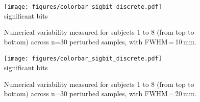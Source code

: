 \documentclass[lettersize,journal]{IEEEtran}
\begin{document}
\begin{figure}
  \vspace*{-2cm}
  \centering
  \vspace*{-20pt}\hspace{15pt}
  \texttt{[image: figures/colorbar\_sigbit\_discrete.pdf]} \\
  \vspace*{-5pt}
  significant bits
  \caption{Numerical variability measured for subjects 1 to 8 (from top to bottom) across n=30 perturbed samples, with FWHM\,=\,10\,mm. }
  \label{fig:uncertainty-maps-10mm-disc}
\end{figure}

\begin{figure}
  \vspace*{-2cm}
  \centering
  \vspace*{-20pt}\hspace{15pt}
  \texttt{[image: figures/colorbar\_sigbit\_discrete.pdf]} \\
  \vspace*{-5pt}
  significant bits
  \caption{Numerical variability measured for subjects 1 to 8 (from top to bottom) across n=30 perturbed samples, with FWHM\,=\,20\,mm. }
  \label{fig:uncertainty-maps-20mm-disc}
\end{figure}
\end{document}
